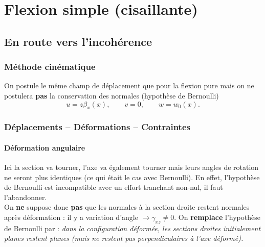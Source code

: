 \chapter{Flexion simple (cisaillante)}
\section{En route vers l'incohérence}
	\subsection{Méthode cinématique}
	On postule le même	champ de déplacement que pour la flexion pure mais
	on ne postulera \textbf{pas} la conservation des normales (hypothèse 
	de Bernoulli)	
	\begin{equation}
	u=z\beta_x(x),\qquad v=0,\qquad w=w_0(x).
	\end{equation}
	
	\subsection{Déplacements – Déformations – Contraintes}
		\subsubsection{Déformation angulaire}
		Ici la section va tourner, l'axe va également tourner mais leurs 
		angles de rotation ne seront plus identiques (ce qui était le cas 
		avec Bernoulli). En effet, l'hypothèse de Bernoulli est incompatible 
		avec un effort tranchant non-nul, il faut l'abandonner.\\
		
		On \textbf{ne} suppose donc \textbf{pas} que les normales à la 
		section droite restent normales après déformation : il y a variation 
		d'angle $\rightarrow \gamma_{xz} \neq 0$.
		On \textbf{remplace} l'hypothèse de Bernoulli par : \textit{dans la 
		configuration déformée, les sections droites initialement planes 
		restent planes (mais ne restent pas perpendiculaires à l'axe déformé).}
		
